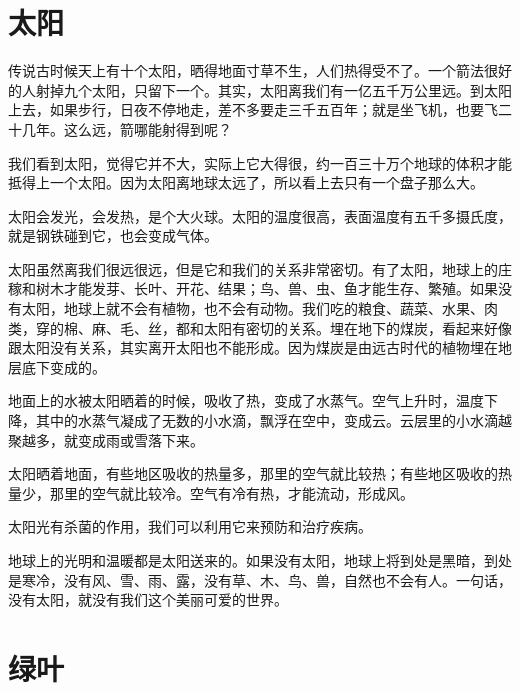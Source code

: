 \documentclass[12pt,UTF-8,openany]{ctexbook}
\begin{document}
\chapter{太阳}

\begin{large}
    
    传说古时候天上有十个太阳，晒得地面寸草不生，人们热得受不了。一个箭法很好的人射掉九个太阳，只留下一个。其实，太阳离我们有一亿五千万公里远。到太阳上去，如果步行，日夜不停地走，差不多要走三千五百年；就是坐飞机，也要飞二十几年。这么远，箭哪能射得到呢？
    
    我们看到太阳，觉得它并不大，实际上它大得很，约一百三十万个地球的体积才能抵得上一个太阳。因为太阳离地球太远了，所以看上去只有一个盘子那么大。
    
    太阳会发光，会发热，是个大火球。太阳的温度很高，表面温度有五千多摄氏度，就是钢铁碰到它，也会变成气体。
    
    太阳虽然离我们很远很远，但是它和我们的关系非常密切。有了太阳，地球上的庄稼和树木才能发芽、长叶、开花、结果；鸟、兽、虫、鱼才能生存、繁殖。如果没有太阳，地球上就不会有植物，也不会有动物。我们吃的粮食、蔬菜、水果、肉类，穿的棉、麻、毛、丝，都和太阳有密切的关系。埋在地下的煤炭，看起来好像跟太阳没有关系，其实离开太阳也不能形成。因为煤炭是由远古时代的植物埋在地层底下变成的。
    
    地面上的水被太阳晒着的时候，吸收了热，变成了水蒸气。空气上升时，温度下降，其中的水蒸气凝成了无数的小水滴，飘浮在空中，变成云。云层里的小水滴越聚越多，就变成雨或雪落下来。
    
    太阳晒着地面，有些地区吸收的热量多，那里的空气就比较热；有些地区吸收的热量少，那里的空气就比较冷。空气有冷有热，才能流动，形成风。
    
    太阳光有杀菌的作用，我们可以利用它来预防和治疗疾病。
    
    地球上的光明和温暖都是太阳送来的。如果没有太阳，地球上将到处是黑暗，到处是寒冷，没有风、雪、雨、露，没有草、木、鸟、兽，自然也不会有人。一句话，没有太阳，就没有我们这个美丽可爱的世界。
    
\end{large}



\chapter{绿叶}
\end{document}
